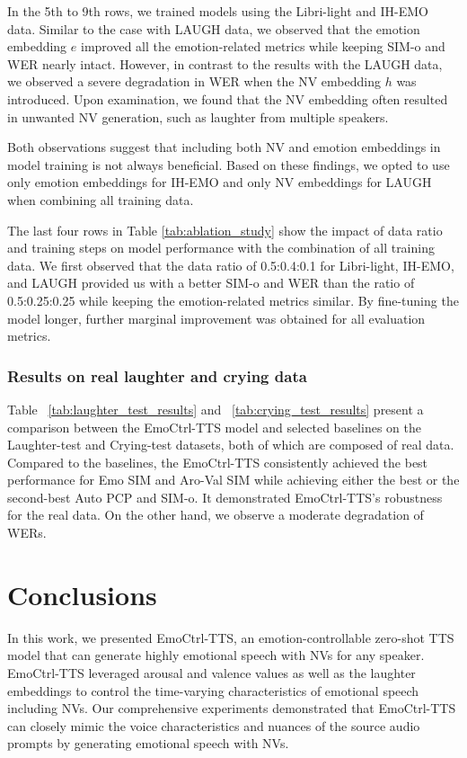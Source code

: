 In the 5th to 9th rows, we trained models using the Libri-light and IH-EMO data. Similar to the case with LAUGH data, we observed that the emotion embedding $e$ improved all the emotion-related metrics while keeping SIM-o and WER nearly intact. However, in contrast to the results with the LAUGH data, we observed a severe degradation in WER when the NV embedding $h$ was introduced. Upon examination, we found that the NV embedding often resulted in unwanted NV generation, such as laughter from multiple speakers.

Both observations suggest that including both NV and emotion embeddings in model training is not always beneficial. Based on these findings, we opted to use only emotion embeddings for IH-EMO and only NV embeddings for LAUGH when combining all training data.

The last four rows in Table \ref{tab:ablation_study} show the impact of data ratio and training steps on model performance with the combination of all training data.
We first observed that
the data ratio of 0.5:0.4:0.1 for Libri-light, IH-EMO, and LAUGH provided
us with a better SIM-o and WER than the ratio of 0.5:0.25:0.25
while keeping the emotion-related metrics similar. 
By fine-tuning the model longer,
further marginal improvement was obtained for all evaluation metrics.

\vspace{-.5em}
\subsubsection{Results on real laughter and crying data}
\vspace{-.5em}

Table ~\ref{tab:laughter_test_results} and ~\ref{tab:crying_test_results} present a comparison between the EmoCtrl-TTS model and selected baselines on the Laughter-test and Crying-test datasets, both of which are composed of real data. Compared to the baselines, the EmoCtrl-TTS consistently achieved
the best performance for Emo SIM and Aro-Val SIM while achieving either the best or the second-best Auto PCP and SIM-o.
It demonstrated EmoCtrl-TTS's robustness for the real data. 
On the other hand, we observe a moderate degradation of WERs. 

\section{Conclusions}
\label{sec:conclusions}

In this work, we presented EmoCtrl-TTS, an emotion-controllable zero-shot TTS model 
that can generate highly emotional speech with NVs for any speaker.
EmoCtrl-TTS leveraged arousal and valence values as well as the laughter embeddings to control the time-varying characteristics of emotional speech including NVs. 
Our comprehensive experiments demonstrated that EmoCtrl-TTS can closely mimic the voice characteristics and nuances of the source audio prompts by generating emotional speech with NVs.
